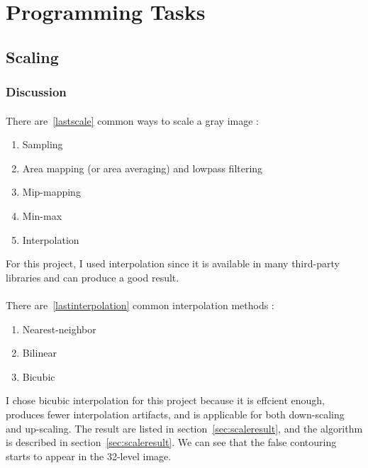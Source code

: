 \documentclass{article}
\begin{document}
\section{Programming Tasks}
\subsection{Scaling}

\subsubsection{Discussion}
\paragraph{}
There are~\ref{lastscale} common ways to scale a gray image \cite{leptonica}:

\begin{enumerate}
\item Sampling
\item Area mapping (or area averaging) and lowpass filtering
\item Mip-mapping
\item Min-max
\item Interpolation \label{lastscale}
\end{enumerate}

For this project, I used interpolation since it is available in many third-party libraries and can produce a good result.

\paragraph{}

There are~\ref{lastinterpolation} common interpolation methods \cite{gonzalez2008digital}:
\begin{enumerate}
\item Nearest-neighbor
\item Bilinear
\item Bicubic \label{lastinterpolation}
\end{enumerate}

I chose bicubic interpolation for this project because it is effcient enough, produces fewer interpolation artifacts, and is applicable for both down-scaling and up-scaling. The result are listed in section~\ref{sec:scaleresult}, and the algorithm is described in section~\ref{sec:scaleresult}. We can see that the false contouring starts to appear in the 32-level image.
\end{document}
